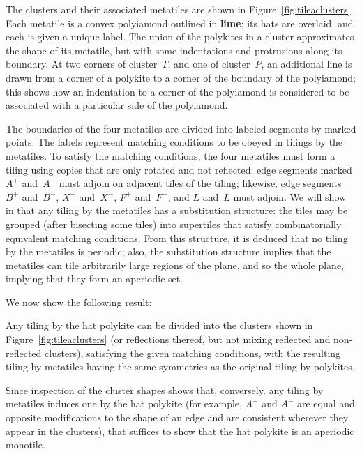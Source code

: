 The clusters and their associated metatiles
are shown in Figure~\ref{fig:tileaclusters}.
Each metatile is a convex polyiamond outlined in
\textcolor{\colcluster}{\textbf{lime}}; its hats are overlaid, and 
each is given a unique label.
The union of the polykites in a cluster approximates the shape of
its metatile, but with some indentations and protrusions along its
boundary.  At two corners of cluster~$T$, and one of cluster~$P$, an
additional line is drawn from a corner of a polykite to a corner of
the boundary of the polyiamond; this shows how an indentation to a
corner of the polyiamond is considered to be associated with a
particular side of the polyiamond.  

The boundaries of the four metatiles
are divided into labeled segments by marked points.
The labels represent matching conditions to be obeyed in tilings 
by the metatiles.  To satisfy the matching conditions, the four
metatiles must form a tiling using copies that are only rotated and
not reflected; edge segments marked $A^+$ and~$A^-$ must adjoin on
adjacent tiles of the tiling; likewise, edge segments $B^+$ and~$B^-$,
$X^+$ and~$X^-$, $F^+$ and~$F^-$, and $L$ and~$L$ must adjoin.
We will show in  that any
tiling by the metatiles has a substitution structure: the tiles may be
grouped (after bisecting some tiles) into supertiles that satisfy
combinatorially equivalent matching conditions.  From this structure, it is
deduced that no tiling by the metatiles is periodic; also, the
substitution structure implies that the metatiles can tile arbitrarily
large regions of the plane, and so the whole plane, implying that they form an
aperiodic set.

We now show the following result:

\begin{theorem}
\label{thm:clusters}
Any tiling by the hat polykite can be divided into the clusters shown
in Figure~\ref{fig:tileaclusters} (or reflections thereof, but not
mixing reflected and non-reflected clusters), satisfying the given
matching conditions, with the resulting tiling by metatiles having the
same symmetries as the original tiling by polykites.
\end{theorem}

Since inspection
of the cluster shapes shows that, conversely, any tiling by metatiles
induces one by the hat polykite (for example, $A^+$ and $A^-$ are
equal and opposite modifications to the shape of an edge and are
consistent wherever they appear in the clusters), that suffices to
show that the hat polykite is an aperiodic monotile.

